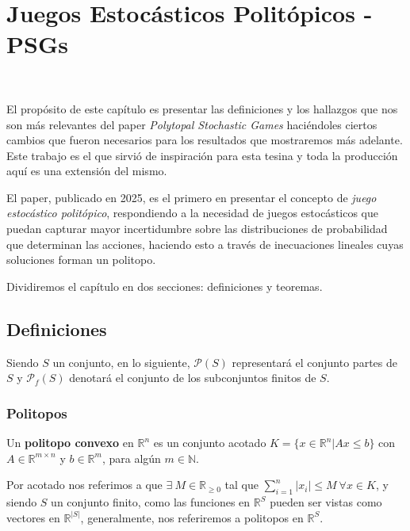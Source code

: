 \chapter{Juegos Estocásticos Politópicos - PSGs}
~\label{cap:psg}
\vspace{-1cm}

El propósito de este capítulo es presentar las definiciones y los hallazgos que
nos son más relevantes del paper \textit{Polytopal Stochastic Games}
\cite{Polytopal} haciéndoles ciertos cambios que fueron necesarios para los
resultados que mostraremos más adelante. Este trabajo es el que sirvió de
inspiración para esta tesina y toda la producción aquí es una extensión del
mismo.

El paper, publicado en 2025, es el primero en presentar el concepto de
\textit{juego estocástico politópico}, respondiendo a la necesidad de juegos
estocásticos que puedan capturar mayor incertidumbre sobre las distribuciones
de probabilidad que determinan las acciones, haciendo esto a través de
inecuaciones lineales cuyas soluciones forman un politopo.


Dividiremos el capítulo en dos secciones: definiciones y teoremas.

\section{Definiciones}

Siendo $S$ un conjunto, en lo siguiente, $\mathscr{P}(S)$ representará el
conjunto partes de $S$ y $\mathscr{P}_f(S)$ denotará el conjunto de los
subconjuntos finitos de $S$.

\subsection*{Politopos}

Un \textbf{politopo convexo} en $\mathbb{R}^n$ es un conjunto acotado $K = \{ x
	\in \mathbb{R}^n | Ax \leq b\}$ con $A \in \mathbb{R}^{m\times n}$ y $ b \in
	\mathbb{R}^m$, para algún $m \in \mathbb{N}$.

Por acotado nos referimos a que $\exists \ M \in \mathbb{R}_{\geq 0}$ tal que
$\sum_{i=1}^{n} |x_i| \leq M \ \forall x \in K$, y siendo $S$ un conjunto
finito, como las funciones en $\mathbb{R}^S$ pueden ser vistas como vectores en
$\mathbb{R}^{|S|}$, generalmente, nos referiremos a politopos en
$\mathbb{R}^S$.

